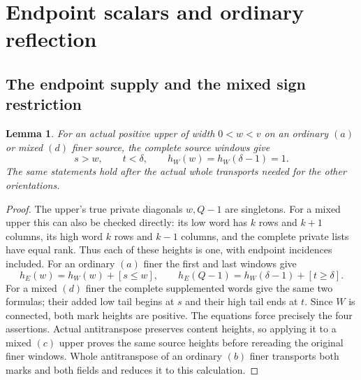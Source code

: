 \documentclass[11pt,a4paper]{amsart}
\numberwithin{equation}{section}
\theoremstyle{plain}
\newtheorem{lemma}[theorem]{Lemma}
\theoremstyle{definition}
\begin{document}
\section{Endpoint scalars and ordinary reflection}\label{app:endpoints}

\subsection{The endpoint supply and the mixed sign restriction}

\begin{lemma}\label{ph:pinches}
For an actual positive upper of width \(0<w<v\) on an ordinary
\((a)\) or mixed \((d)\) finer source, the complete source windows give
\[
 s>w,\qquad t<\delta,\qquad h_W(w)=h_W(\delta-1)=1.
\]
The same statements hold after the actual whole transports needed for
the other orientations.
\end{lemma}
\begin{proof}
The upper's true private diagonals \(w,Q-1\) are singletons.
For a mixed upper this can also be checked directly: its low word
has \(k\) rows and \(k+1\) columns, its high word \(k\) rows and \(k-1\)
columns, and the complete private lists have equal rank.
Thus each of these heights is one, with endpoint incidences included.
For an ordinary \((a)\) finer the first and last windows give
\[
 h_E(w)=h_W(w)+[s\le w],\qquad
 h_E(Q-1)=h_W(\delta-1)+[t\ge\delta].
\]
For a mixed \((d)\) finer the complete supplemented words give the
same two formulas; their added low tail begins at \(s\) and their
high tail ends at \(t\).
Since \(W\) is connected, both mark heights are positive.
The equations force precisely the four assertions.
Actual antitranspose preserves content heights, so applying it to a mixed
\((c)\) upper proves the same source heights before rereading the
original finer windows.  Whole antitranspose of an ordinary \((b)\) finer
transports both marks and both fields and reduces it to this calculation.
\end{proof}
\end{document}
